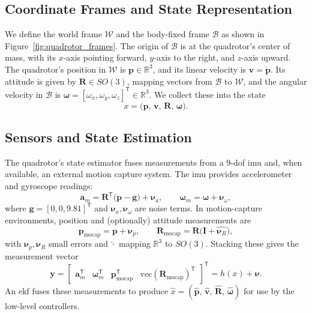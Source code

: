 \subsection{Coordinate Frames and State Representation}
\label{sec:quadrotor_state}
We define the world frame \(\mathcal{W}\) and the body-fixed frame \(\mathcal{B}\) as shown in Figure~\ref{fig:quadrotor_frames}. The origin of \(\mathcal{B}\) is at the quadrotor's center of mass, with its \(x\)-axis pointing forward, \(y\)-axis to the right, and \(z\)-axis upward. The quadrotor's position in \(\mathcal{W}\) is \(\mathbf{p} \in \mathbb{R}^3\), and its linear velocity is \(\mathbf{v} = \dot{\mathbf{p}}\). Its attitude is given by \(\mathbf{R} \in SO(3)\), mapping vectors from \(\mathcal{B}\) to \(\mathcal{W}\), and the angular velocity in \(\mathcal{B}\) is \(\boldsymbol{\omega} = [\omega_x,\omega_y,\omega_z]^\mathsf{T} \in \mathbb{R}^3\). We collect these into the state
\begin{equation}
x = \bigl(\mathbf{p},\,\mathbf{v},\,\mathbf{R},\,\boldsymbol{\omega}\bigr).
\end{equation}

\subsection{Sensors and State Estimation}
\label{sec:quadrotor_estimation}
The quadrotor's state estimator fuses measurements from a 9-\gls{dof} \gls{imu} and, when available, an external motion capture system. The \gls{imu} provides accelerometer and gyroscope readings:
\begin{equation}
\mathbf{a}_m = \mathbf{R}^\mathsf{T}\bigl(\ddot{\mathbf{p}} - \mathbf{g}\bigr) + \boldsymbol{\nu}_a,\qquad
\boldsymbol{\omega}_m = \boldsymbol{\omega} + \boldsymbol{\nu}_\omega,
\end{equation}
where \(\mathbf{g}=[0,0,9.81]^\mathsf{T}\) and \(\boldsymbol{\nu}_a,\boldsymbol{\nu}_\omega\) are noise terms. In motion-capture environments, position and (optionally) attitude measurements are
\begin{equation}
\mathbf{p}_{\mathrm{mocap}} = \mathbf{p} + \boldsymbol{\nu}_p,\qquad
\mathbf{R}_{\mathrm{mocap}} = \mathbf{R}\bigl(\mathbf{I} + \widehat{\boldsymbol{\nu}_R}\bigr),
\end{equation}
with \(\boldsymbol{\nu}_p,\boldsymbol{\nu}_R\) small errors and \(\widehat{\cdot}\) mapping \(\mathbb{R}^3\) to \(SO(3)\). Stacking these gives the measurement vector
\begin{equation}
\mathbf{y} = \begin{bmatrix}
\mathbf{a}_m^\mathsf{T} & \boldsymbol{\omega}_m^\mathsf{T} & \mathbf{p}_{\mathrm{mocap}}^\mathsf{T} & \mathrm{vec}(\mathbf{R}_{\mathrm{mocap}})^\mathsf{T}
\end{bmatrix}^\mathsf{T} = h(x) + \boldsymbol{\nu}.
\end{equation}
An \gls{ekf} fuses these measurements to produce \(\hat{x} = (\hat{\mathbf{p}},\,\hat{\mathbf{v}},\,\hat{\mathbf{R}},\,\hat{\boldsymbol{\omega}})\) for use by the low-level controllers.
